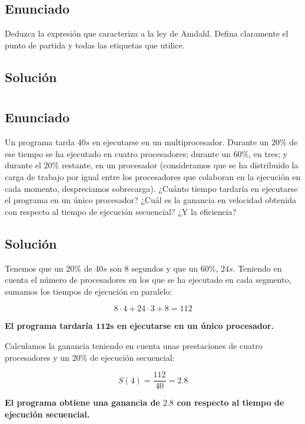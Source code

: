 \subsection{Enunciado}

Deduzca la expresión que caracteriza a la ley de Amdahl. Defina claramente el punto de partida y todas las etiquetas que utilice.

\subsection{Solución}

\section{}\label{ej-2-7}

\subsection{Enunciado}

Un programa tarda $40s$ en ejecutarse en un multiprocesador.
Durante un $20\%$ de ese tiempo se ha ejecutado en cuatro procesadores; durante un $60\%$, en tres; y durante el $20\%$ restante, en un procesador (consideramos que se ha distribuido la carga de trabajo por igual entre los procesadores que colaboran en la ejecución en cada momento, despreciamos sobrecarga).
¿Cuánto tiempo tardaría en ejecutarse el programa en un único procesador?
¿Cuál es la ganancia en velocidad obtenida con respecto al tiempo de ejecución secuencial?
¿Y la eficiencia?

\subsection{Solución}

Tenemos que un $20\%$ de $40s$ son $8$ segundos y que un $60\%$, $24s$.
Teniendo en cuenta el número de procesadores en los que se ha ejecutado en cada segmento, sumamos los tiempos de ejecución en paralelo:

\[8\cdot4+24\cdot3+8=112\]

\textbf{El programa tardaría $\boldsymbol{112s}$ en ejecutarse en un único procesador.}

Calculamos la ganancia teniendo en cuenta unas prestaciones de cuatro procesadores y un $20\%$ de ejecución secuencial:

\[S(4)=\frac{112}{40}=2.8\]

\textbf{El programa obtiene una ganancia de $\boldsymbol{2.8}$ con respecto al tiempo de ejecución secuencial.}

